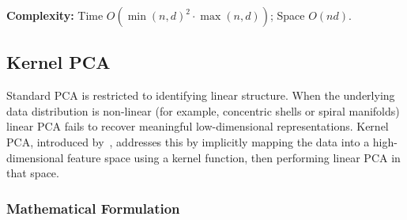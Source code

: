 \textbf{Complexity:} Time $O(\min(n,d)^2 \cdot \max(n,d))$; Space $O(nd)$.

\subsection{Kernel PCA}

Standard PCA is restricted to identifying linear structure. When the underlying data distribution is non-linear (for example, concentric shells or spiral manifolds) linear PCA fails to recover meaningful low-dimensional representations. Kernel PCA, introduced by~\citet{scholkopf1997kernel}, addresses this by implicitly mapping the data into a high-dimensional feature space using a kernel function, then performing linear PCA in that space.

\subsubsection*{Mathematical Formulation}

